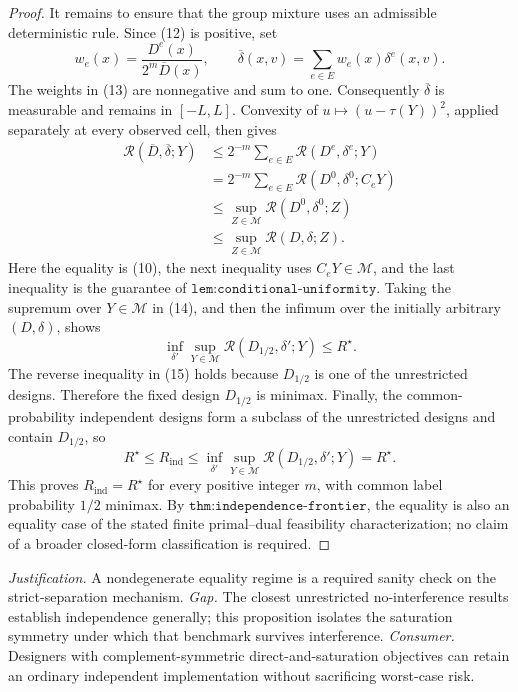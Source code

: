 \documentclass{article}
\begin{document}
\begin{proof}
It remains to ensure that the group mixture uses an admissible
deterministic rule.  Since (12) is positive, set
\[
 w_e(x)=\frac{D^e(x)}{2^m\overline D(x)},\qquad
 \overline\delta(x,v)=\sum_{e\in E}w_e(x)\delta^e(x,v).              \tag{13}
\]
The weights in (13) are nonnegative and sum to one.  Consequently
\(\overline\delta\) is measurable and remains in \([-L,L]\).  Convexity
of \(u\mapsto(u-\tau(Y))^2\), applied separately at every observed cell,
then gives
\[
\begin{aligned}
 \mathcal R(\overline D,\overline\delta;Y)
 &\le 2^{-m}\sum_{e\in E}\mathcal R(D^e,\delta^e;Y)\\
 &=2^{-m}\sum_{e\in E}\mathcal R(D^0,\delta^0;C_eY)\\
 &\le \sup_{Z\in\mathcal M}\mathcal R(D^0,\delta^0;Z)\\
 &\le \sup_{Z\in\mathcal M}\mathcal R(D,\delta;Z).                \tag{14}
\end{aligned}
\]
Here the equality is (10), the next inequality uses
\(C_eY\in\mathcal M\), and the last inequality is the guarantee of
\(\texttt{lem:conditional-uniformity}\).  Taking the supremum over
\(Y\in\mathcal M\) in (14), and then the infimum over the initially
arbitrary \((D,\delta)\), shows
\[
 \inf_{\delta'}\sup_{Y\in\mathcal M}
       \mathcal R(D_{1/2},\delta';Y)\le R^\star.                     \tag{15}
\]
The reverse inequality in (15) holds because \(D_{1/2}\) is one of the
unrestricted designs.  Therefore the fixed design \(D_{1/2}\) is minimax.
Finally, the common-probability independent designs form a subclass of the
unrestricted designs and contain \(D_{1/2}\), so
\[
 R^\star\le R_{\mathrm{ind}}
 \le\inf_{\delta'}\sup_{Y\in\mathcal M}
       \mathcal R(D_{1/2},\delta';Y)
 =R^\star.                                                          \tag{16}
\]
This proves \(R_{\mathrm{ind}}=R^\star\) for every positive integer
\(m\), with common label probability \(1/2\) minimax.  By
\(\texttt{thm:independence-frontier}\), the equality is also an equality
case of the stated finite primal--dual feasibility characterization; no
claim of a broader closed-form classification is required.
\end{proof}
\par\smallskip\noindent \textit{Justification.} A nondegenerate equality regime is a required sanity check on the strict-separation mechanism. \textit{Gap.} The closest unrestricted no-interference results establish independence generally; this proposition isolates the saturation symmetry under which that benchmark survives interference. \textit{Consumer.} Designers with complement-symmetric direct-and-saturation objectives can retain an ordinary independent implementation without sacrificing worst-case risk.
\end{document}
